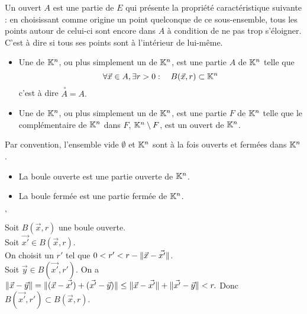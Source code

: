 \documentclass{book}
\begin{document}
Un ouvert $A$ est une partie de $E$ qui présente la propriété caractéristique suivante : en choisissant comme origine un point quelconque de ce sous-ensemble, tous les points autour de celui-ci sont encore dans $A$ à condition de ne pas trop s'éloigner. C'est à dire si tous ses points sont à l'intérieur de lui-même. 
\begin{Definition}
\begin{itemize}
\item Une  de $\mathbb{K}^n$, ou plus simplement un  de $\mathbb{K}^n$, est une partie $A$ de $\mathbb{K}^n$ telle que $$\forall \vec{x}\in A, \exists r>0:\quad B(\vec{x},r)\subset \mathbb{K}^n$$
c'est à dire  $\stackrel {\ \circ }{A}=A.$
\item Une  de $\mathbb{K}^n$, ou plus simplement un  de $\mathbb{K}^n$, est une partie $F$ de $\mathbb{K}^n$ telle que le complémentaire de $\mathbb{K}^n$ dans $F$, $\mathbb{K}^n\setminus F$, est un ouvert de $\mathbb{K}^n$.
\end{itemize}
Par convention, l'ensemble vide $\emptyset$ et $\mathbb{K}^n$ sont à la fois ouverts et fermées dans $\mathbb{K}^n$.
\end{Definition}
\begin{Proposition}
\begin{itemize}
\item La boule ouverte est une partie ouverte de $\mathbb{K}^n$.
\item La boule fermée  est une partie fermée de $\mathbb{K}^n$.
\end{itemize}
\end{Proposition}
\begin{Demonstration}$,$\\
\begin{minipage}[c]{0.6\linewidth}{
Soit $B(\vec{x},r)$ une boule ouverte.\\
Soit $\vec{x'}\in B(\vec{x},r)$. \\
On choisit un $r'$ tel que $0< r' < r -\mathopen\lVert \vec{x}-\vec{x'} \mathclose\rVert$.\\
Soit $\vec{y}\in B(\vec{x'},r')$. On a $\mathopen\lVert \vec{x}-\vec{y} \mathclose\rVert=\mathopen\lVert (\vec{x}-\vec{x'})+(\vec{x'}-\vec{y}) \mathclose\rVert\leq \mathopen\lVert \vec{x}-\vec{x'} \mathclose\rVert + \mathopen\lVert \vec{x'}-\vec{y} \mathclose\rVert<r.$ Donc $B(\vec{x'},r')\subset B(\vec{x},r).$
}
\end{minipage} 
    \begin{minipage}[c]{0.4\linewidth}{\hspace*{0.2\linewidth}
    \begin{tiny}
\end{tiny}
}
\end{minipage} 
\end{Demonstration}
\end{document}
